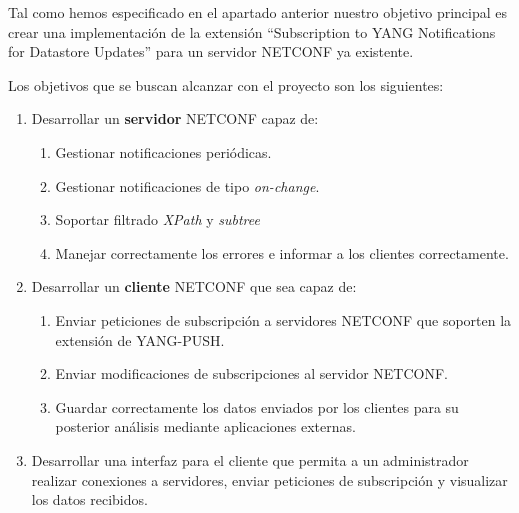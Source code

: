     Tal como hemos especificado en el apartado anterior nuestro objetivo principal es crear una implementación de la extensión \enquote{Subscription to YANG Notifications for Datastore Updates} para un servidor NETCONF ya existente.

Los objetivos que se buscan alcanzar con el proyecto son los siguientes:

\begin{enumerate}[label=\textbf{O\arabic*} - , leftmargin=3\parindent]

    \item Desarrollar un \textbf{servidor} NETCONF capaz de:
        \begin{enumerate}[label=\textbf{O1.\arabic*} - , leftmargin=1\parindent]
            \item Gestionar notificaciones periódicas.
            \item Gestionar notificaciones de tipo \textit{on-change}.
            \item Soportar filtrado \textit{XPath} y \textit{subtree}
            \item Manejar correctamente los errores e informar a los clientes correctamente.
        \end{enumerate}    
    
    \item Desarrollar un \textbf{cliente} NETCONF que sea capaz de:
        \begin{enumerate}[label=\textbf{O2.\arabic*} - , leftmargin=1\parindent]
            \item Enviar peticiones de subscripción a servidores NETCONF que soporten la extensión de YANG-PUSH.
            \item Enviar modificaciones de subscripciones al servidor NETCONF.
            \item Guardar correctamente los datos enviados por los clientes para su posterior análisis mediante aplicaciones externas.
        \end{enumerate}    
    \item Desarrollar una interfaz para el cliente que permita a un administrador realizar conexiones a servidores, enviar peticiones de subscripción y visualizar los datos recibidos.
\end{enumerate}



